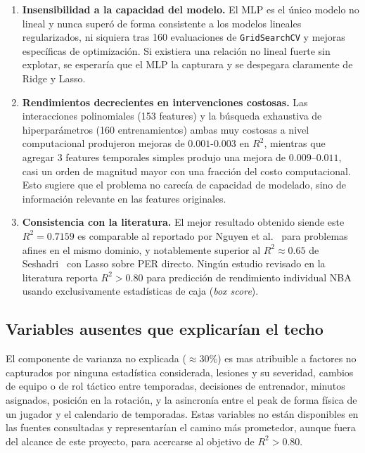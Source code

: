 \documentclass[11pt,a4paper]{article}
\begin{document}
\begin{enumerate}[leftmargin=*, itemsep=5pt]
    \item \textbf{Insensibilidad a la capacidad del modelo.} El MLP es el único modelo no lineal y nunca superó de forma consistente a los
    modelos lineales regularizados, ni siquiera tras 160 evaluaciones de
    \texttt{GridSearchCV} y mejoras específicas de optimización.
    Si existiera una relación no lineal fuerte sin explotar,
    se esperaría que el MLP la capturara y se despegara claramente de
    Ridge y Lasso.

    \item \textbf{Rendimientos decrecientes en intervenciones costosas.}
    Las interacciones polinomiales (153 features) y la búsqueda
    exhaustiva de hiperparámetros (160 entrenamientos) ambas
    muy costosas a nivel computacional produjeron mejoras de $0.001$-$0.003$ en
    $R^2$, mientras que agregar 3 features temporales simples
    produjo una mejora de $0.009$--$0.011$, casi un orden de magnitud
    mayor con una fracción del costo computacional. Esto sugiere que el
    problema no carecía de capacidad de modelado, sino de
    información relevante en las features originales.

    \item \textbf{Consistencia con la literatura.} El mejor resultado
    obtenido  siende este $R^2=0.7159$ es comparable al reportado por
    Nguyen et al.~\cite{nguyen2022} para problemas afines en el mismo
    dominio, y notablemente superior al $R^2\approx 0.65$ de
    Seshadri~\cite{seshadri2024} con Lasso sobre PER directo. Ningún
    estudio revisado en la literatura reporta $R^2 > 0.80$ para predicción
    de rendimiento individual NBA usando exclusivamente estadísticas de
    caja (\textit{box score}).
\end{enumerate}

\subsection{Variables ausentes que explicarían el techo}

El componente de varianza no explicada ($\approx 30\%$) es mas
atribuible a factores no capturados por ninguna estadística considerada,
lesiones y su severidad, cambios de equipo o de rol táctico entre
temporadas, decisiones de entrenador, minutos asignados, posición en la
rotación, y la asincronía entre el peak de forma física de un jugador y
el calendario de temporadas. Estas variables no están disponibles en
las fuentes consultadas y representarían el camino más prometedor, aunque fuera
del alcance de este proyecto, para acercarse al objetivo de
$R^2 > 0.80$.
\end{document}
